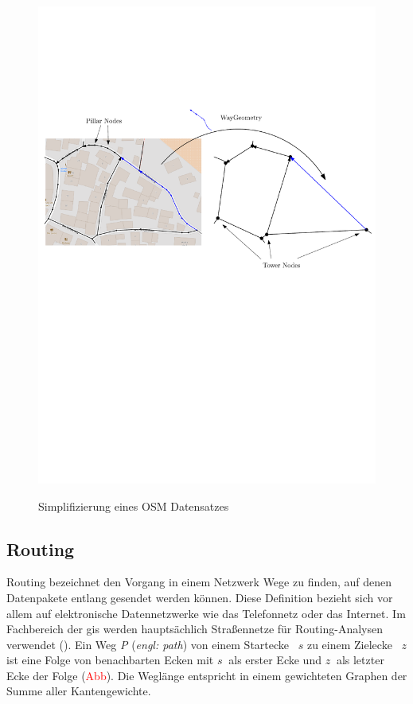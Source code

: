\documentclass[12pt,a4paper]{article}
\newcommand\todo[1]{\textcolor{red}{#1}}
\begin{document}
\begin{figure}[h]
\centering
\includegraphics[width = \textwidth]{../media/towers.pdf} \\
\caption{Simplifizierung eines OSM Datensatzes}
\label{fig:tower}
\end{figure}

\subsection{Routing}

Routing bezeichnet den Vorgang in einem Netzwerk Wege zu finden, auf denen Datenpakete entlang gesendet werden können. Diese Definition bezieht sich vor allem auf elektronische Datennetzwerke wie das Telefonnetz oder das Internet. Im Fachbereich der \gls{gis} werden hauptsächlich Straßennetze für Routing-Analysen verwendet (\cite[165]{handbook}). Ein Weg \textit{P} (\textit{engl: path}) von einem Startecke ~$s$ zu einem Zielecke ~$z$ ist eine Folge von benachbarten Ecken mit $s~$ als erster Ecke und $z~$ als letzter Ecke der Folge (\todo{Abb}).
Die Weglänge entspricht in einem gewichteten Graphen der Summe aller Kantengewichte.
\end{document}
